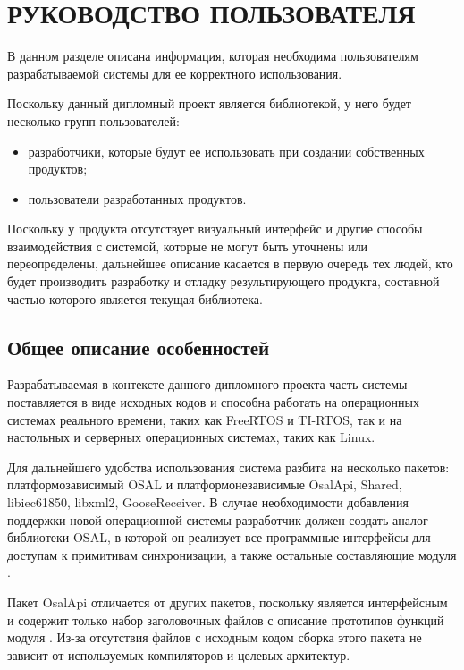 \section{РУКОВОДСТВО ПОЛЬЗОВАТЕЛЯ}
\label{sec:manual}

В данном разделе описана информация, которая необходима пользователям
разрабатываемой системы для ее корректного использования.

Поскольку данный дипломный проект является библиотекой, у него будет
несколько групп пользователей:
\begin{itemize}
    \item разработчики, которые будут ее использовать при создании собственных продуктов;
    \item пользователи разработанных продуктов.
\end{itemize}

Поскольку у продукта отсутствует визуальный интерфейс и другие способы
взаимодействия с системой, которые не могут быть уточнены или переопределены,
дальнейшее описание касается в первую очередь тех людей, кто будет
производить разработку и отладку результирующего продукта, составной частью которого
является текущая библиотека.

\subsection{Общее описание особенностей}

Разрабатываемая в контексте данного дипломного проекта
часть системы поставляется в виде исходных кодов и способна работать
на операционных системах реального времени, таких как FreeRTOS и TI-RTOS, так и
на настольных и серверных операционных системах, таких как Linux.

Для дальнейшего удобства использования система разбита на несколько пакетов:
платформозависимый OSAL и платформонезависимые OsalApi, Shared, libiec61850,
libxml2, GooseReceiver.
В случае необходимости добавления поддержки новой операционной системы разработчик
должен создать аналог библиотеки OSAL, в которой он реализует все программные
интерфейсы для доступам к примитивам синхронизации, а также остальные составляющие
модуля \moduleOsal.

Пакет OsalApi отличается от других пакетов, поскольку
является интерфейсным и содержит только набор заголовочных файлов
с описание прототипов функций модуля \moduleOsal.
Из-за отсутствия файлов с исходным кодом
сборка этого пакета не зависит от используемых компиляторов и целевых архитектур.

